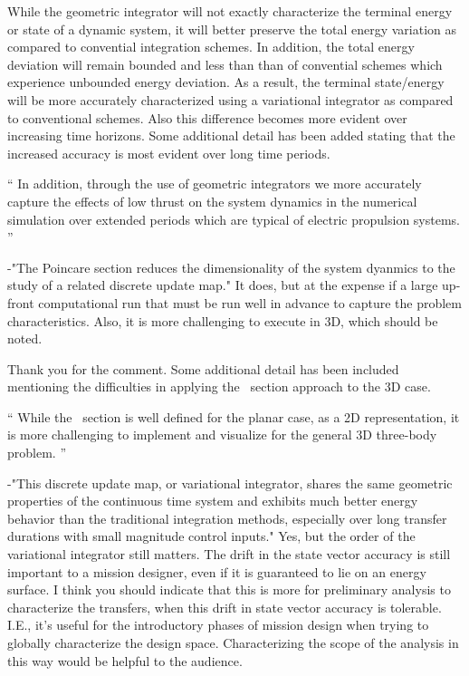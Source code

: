 \documentclass[11pt]{article}
\newenvironment{correction}{\begin{list}{}{\setlength{\leftmargin}{1cm}\setlength{\rightmargin}{1cm}}\vspace{\parsep}\item[]``}{''\end{list}}
\begin{document}
\begin{enumerate}
While the geometric integrator will not exactly characterize the terminal energy or state of a dynamic system, it will better preserve the total energy variation as compared to convential integration schemes. 
In addition, the total energy deviation will remain bounded and less than than of convential schemes which experience unbounded energy deviation. 
As a result, the terminal state/energy will be more accurately characterized using a variational integrator as compared to conventional schemes. 
Also this difference becomes more evident over increasing time horizons.
Some additional detail has been added stating that the increased accuracy is most evident over long time periods. 

\begin{correction}
In addition, through the use of geometric integrators we more accurately capture the effects of low thrust on the system dynamics in the numerical simulation over extended periods which are typical of electric propulsion systems. 
\end{correction}

\item 
    \begin{itshape}
-"The Poincare section reduces the dimensionality of the system dyanmics to the study of a related discrete update map." It does, but at the expense if a large up-front computational run that must be run well in advance to capture the problem characteristics.  Also, it is more challenging to execute in 3D, which should be noted.
\end{itshape}

Thank you for the comment.
Some additional detail has been included mentioning the difficulties in applying the \Poincare~section approach to the 3D case.

\begin{correction}
While the \Poincare~section is well defined for the planar case, as a 2D representation, it is more challenging to implement and visualize for the general 3D three-body problem.
\end{correction}

\item
    \begin{itshape}
-"This discrete update map, or variational integrator, shares the same geometric properties of the continuous time system and exhibits much better energy behavior than the traditional integration methods, especially over long transfer durations with small magnitude control inputs."  Yes, but the order of the variational integrator still matters.  The drift in the state vector accuracy is still important to a mission designer, even if it is guaranteed to lie on an energy surface.  I think you should indicate that this is more for preliminary analysis to characterize the transfers, when this drift in state vector accuracy is tolerable.  I.E., it's useful for the introductory phases of mission design when trying to globally characterize the design space.  Characterizing the scope of the analysis in this way would be helpful to the audience.
\end{itshape}


\end{enumerate}
\end{document}
